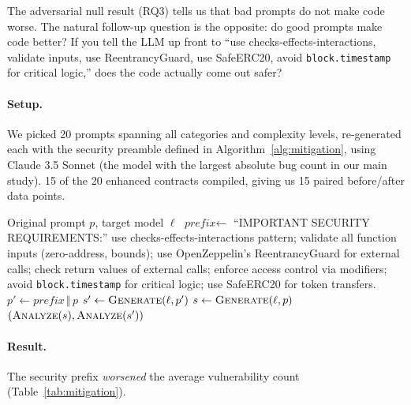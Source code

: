 \documentclass[11pt]{article}
\begin{document}
The adversarial null result (RQ3) tells us that bad prompts do not make code worse. The natural follow-up question is the opposite: do good prompts make code better? If you tell the LLM up front to ``use checks-effects-interactions, validate inputs, use ReentrancyGuard, use SafeERC20, avoid \texttt{block.timestamp} for critical logic,'' does the code actually come out safer?

\paragraph{Setup.} We picked 20 prompts spanning all categories and complexity levels, re-generated each with the security preamble defined in Algorithm~\ref{alg:mitigation}, using Claude 3.5 Sonnet (the model with the largest absolute bug count in our main study). 15 of the 20 enhanced contracts compiled, giving us 15 paired before/after data points.

\begin{algorithm}[H]
\small
\caption{Mitigation experiment: prompt-level intervention}
\label{alg:mitigation}
\begin{algorithmic}[1]
\Require Original prompt $p$, target model $\ell$
\State $\textit{prefix} \gets$ ``IMPORTANT SECURITY REQUIREMENTS:''
\State \quad use checks-effects-interactions pattern;
\State \quad validate all function inputs (zero-address, bounds);
\State \quad use OpenZeppelin's \textsf{ReentrancyGuard} for external calls;
\State \quad check return values of external calls;
\State \quad enforce access control via modifiers;
\State \quad avoid \texttt{block.timestamp} for critical logic;
\State \quad use \textsf{SafeERC20} for token transfers.
\State $p' \gets \textit{prefix} \,\Vert\, p$ 
\State $s' \gets \textsc{Generate}(\ell, p')$
\State $s \gets \textsc{Generate}(\ell, p)$ 
\State \Return $(\textsc{Analyze}(s), \textsc{Analyze}(s'))$ 
\end{algorithmic}
\end{algorithm}

\paragraph{Result.} The security prefix \emph{worsened} the average vulnerability count (Table~\ref{tab:mitigation}).
\end{document}
